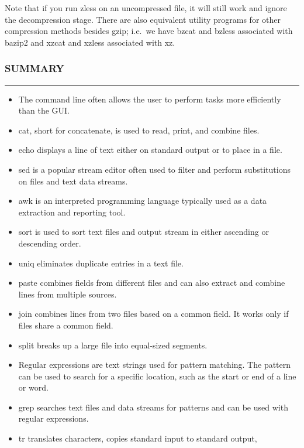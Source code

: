 Note that if you run zless on an uncompressed file, it will still work
and ignore the decompression stage. There are also equivalent utility
programs for other compression methods besides gzip; i.e.~we have bzcat
and bzless associated with bazip2 and xzcat and xzless associated with
xz.

\subsubsection{SUMMARY}\label{summary-11}

\begin{center}\rule{3in}{0.4pt}\end{center}

\begin{itemize}
\itemsep1pt\parskip0pt
\item
  The command line often allows the user to perform tasks more
  efficiently than the GUI.
\item
  cat, short for concatenate, is used to read, print, and combine files.
\item
  echo displays a line of text either on standard output or to place in
  a file.
\item
  sed is a popular stream editor often used to filter and perform
  substitutions on files and text data streams.
\item
  awk is an interpreted programming language typically used as a data
  extraction and reporting tool.
\item
  sort is used to sort text files and output stream in either ascending
  or descending order.
\item
  uniq eliminates duplicate entries in a text file.
\item
  paste combines fields from different files and can also extract and
  combine lines from multiple sources.
\item
  join combines lines from two files based on a common field. It works
  only if files share a common field.
\item
  split breaks up a large file into equal-sized segments.
\item
  Regular expressions are text strings used for pattern matching. The
  pattern can be used to search for a specific location, such as the
  start or end of a line or word.
\item
  grep searches text files and data streams for patterns and can be used
  with regular expressions.
\item
  tr translates characters, copies standard input to standard output,

\end{itemize}

